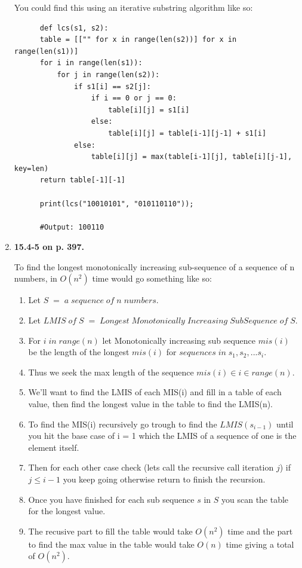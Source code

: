 \documentclass{article}
\begin{document}
\begin{enumerate}
    You could find this using an iterative substring algorithm like so:

    \begin{lstlisting}
      def lcs(s1, s2):
      table = [["" for x in range(len(s2))] for x in range(len(s1))]
      for i in range(len(s1)):
          for j in range(len(s2)):
              if s1[i] == s2[j]:
                  if i == 0 or j == 0:
                      table[i][j] = s1[i]
                  else:
                      table[i][j] = table[i-1][j-1] + s1[i]
              else:
                  table[i][j] = max(table[i-1][j], table[i][j-1], key=len)
      return table[-1][-1]

      print(lcs("10010101", "010110110"));

      #Output: 100110
    \end{lstlisting}

    \item \textbf{15.4-5 on p. 397.}
    
    To find the longest monotonically increasing sub-sequence of a sequence of n numbers, in $O(n^2)$ time would go something like so:

    \begin{enumerate}
      \item Let $S\;=\;a\;sequence\;of\;n\;numbers$.
      \item Let $LMIS\;of\;S\;=\;Longest\;Monotonically\;Increasing\;Sub Sequence\;of\;S$.
      \item For $i\;in\;range(n)$ let Monotonically increasing sub sequence $mis(i)$ be the length of the longest $mis(i)$ for $sequence s\;in\;s_1, s_2, ... s_i$.
      \item Thus we seek the max length of the sequence $mis(i) \in i \in range(n)$.
      \item We'll want to find the LMIS of each MIS(i) and fill in a table of each value, then find the longest value in the table to find the LMIS(n).
      \item To find the MIS(i) recursively go trough to find the $LMIS(s_{i - 1})$ until you hit the base case of i = 1 which the LMIS of a sequence of one is the element itself. 
      \item Then for each other case check (lets call the recursive call iteration $j$) if $j \leq i -1$ you keep going otherwise return to finish the recursion. 
      \item Once you have finished for each sub sequence $s$ in $S$ you scan the table for the longest value.
      \item The recusive part to fill the table would take $O(n^2)$ time and the part to find the max value in the table would take $O(n)$ time giving a total of $O(n^2)$.
    \end{enumerate}


\end{enumerate}
\end{document}
